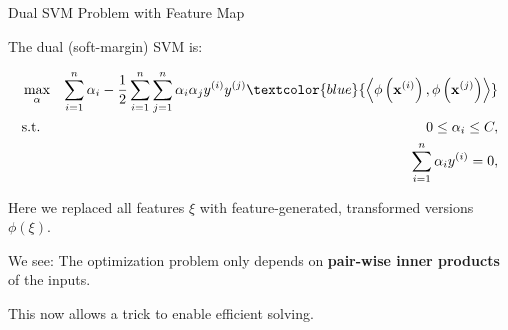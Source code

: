 \documentclass[11pt,compress,t,notes=noshow, xcolor=table]{beamer}
\begin{document}

\begin{vbframe}{Dual SVM Problem with Feature Map}


The dual (soft-margin) SVM is: 
\begin{footnotesize}
\begin{eqnarray*}
    & \max_{\alpha} & \sum_{i=1}^n \alpha_i - \frac{1}{2}\sum_{i=1}^n\sum_{j=1}^n\alpha_i\alpha_j\yi y^{(j)} \textcolor{blue}{\scp{\phi\left(\xi\right)}{\phi\left(\xv^{(j)}\right)}}  \\
    & \text{s.t. } & 0 \le \alpha_i \le C, \\
    & \quad & \sum_{i=1}^n \alpha_i \yi = 0, 
\end{eqnarray*}
\end{footnotesize}

Here we replaced all features $\xi$ with feature-generated, transformed versions $\phi(\xi)$. 

\lz 

We see: The optimization problem only depends on \textbf{pair-wise inner products} of the inputs. 

\lz

This now allows a trick to enable efficient solving.



\end{vbframe}
\end{document}
